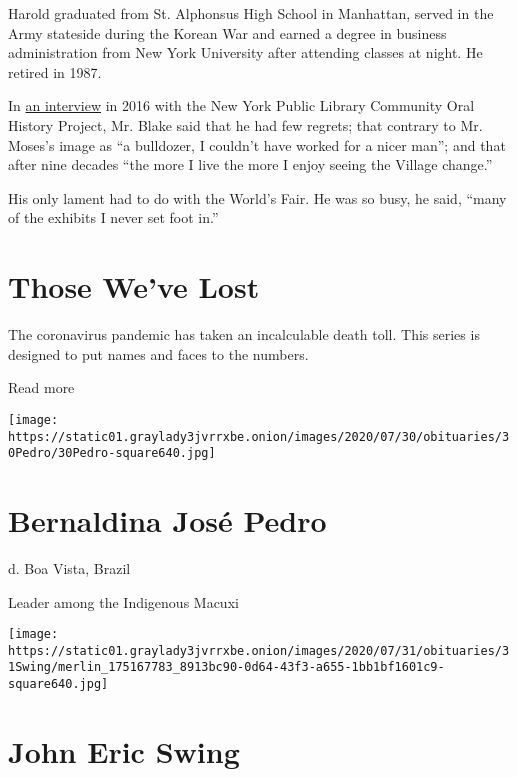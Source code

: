 Harold graduated from St. Alphonsus High School in Manhattan, served in
the Army stateside during the Korean War and earned a degree in business
administration from New York University after attending classes at
night. He retired in 1987.

In \href{http://oralhistory.nypl.org/interviews/harold-blake-xvv7o2}{an
interview} in 2016 with the New York Public Library Community Oral
History Project, Mr. Blake said that he had few regrets; that contrary
to Mr. Moses's image as ``a bulldozer, I couldn't have worked for a
nicer man''; and that after nine decades ``the more I live the more I
enjoy seeing the Village change.''

His only lament had to do with the World's Fair. He was so busy, he
said, ``many of the exhibits I never set foot in.''

\href{https://www.nytimes3xbfgragh.onion/interactive/2020/obituaries/people-died-coronavirus-obituaries.html?action=click\&pgtype=Article\&state=default\&region=BELOW_MAIN_CONTENT\&context=covid_obits_promo}{}

\hypertarget{those-weve-lost}{%
\section{Those We've Lost}\label{those-weve-lost}}

The coronavirus pandemic has taken an incalculable death toll. This
series is designed to put names and faces to the numbers.

Read more

\texttt{[image: https://static01.graylady3jvrrxbe.onion/images/2020/07/30/obituaries/30Pedro/30Pedro-square640.jpg]}

\hypertarget{bernaldina-josuxe9-pedro}{%
\section{Bernaldina José Pedro}\label{bernaldina-josuxe9-pedro}}

d. Boa Vista, Brazil

Leader among the Indigenous Macuxi

\texttt{[image: https://static01.graylady3jvrrxbe.onion/images/2020/07/31/obituaries/31Swing/merlin\_175167783\_8913bc90-0d64-43f3-a655-1bb1bf1601c9-square640.jpg]}

\hypertarget{john-eric-swing}{%
\section{John Eric Swing}\label{john-eric-swing}}

